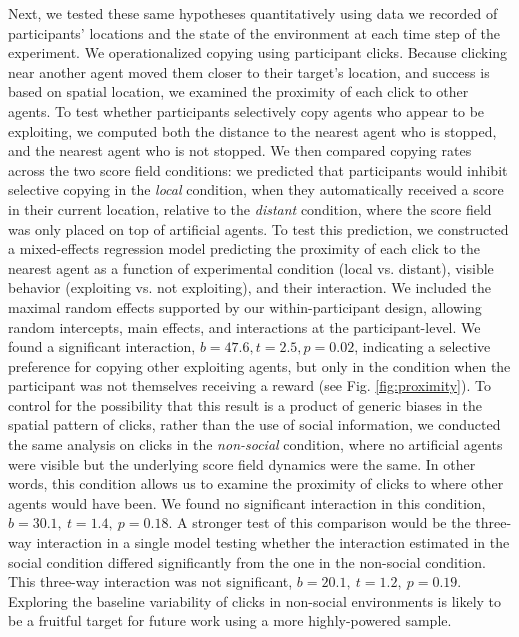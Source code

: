 \documentclass[12pt,letterpaper]{article}
\begin{document}
Next, we tested these same hypotheses quantitatively using data we recorded of participants' locations and the state of the environment at each time step of the experiment.
We operationalized copying using participant clicks.
Because clicking near another agent moved them closer to their target's location, and success is based on spatial location, we examined the proximity of each click to other agents.
To test whether participants selectively copy agents who appear to be exploiting, we computed both the distance to the nearest agent who is stopped, and the nearest agent who is not stopped.
We then compared copying rates across the two score field conditions: we predicted that participants would inhibit selective copying in the \emph{local} condition, when they automatically received a score in their current location, relative to the \emph{distant} condition, where the score field was only placed on top of artificial agents.
To test this prediction, we constructed a mixed-effects regression model predicting the proximity of each click to the nearest agent as a function of experimental condition (local vs. distant), visible behavior (exploiting vs. not exploiting), and their interaction.
We included the maximal random effects supported by our within-participant design, allowing random intercepts, main effects, and interactions at the participant-level.
We found a significant interaction, $b = 47.6, t = 2.5, p = 0.02$, indicating a selective preference for copying other exploiting agents, but only in the condition when the participant was not themselves receiving a reward (see Fig. \ref{fig:proximity}). 
To control for the possibility that this result is a product of generic biases in the spatial pattern of clicks, rather than the use of social information, we conducted the same analysis on clicks in the \emph{non-social} condition, where no artificial agents were visible but the underlying score field dynamics were the same. 
In other words, this condition allows us to examine the proximity of clicks to where other agents would have been. 
We found no significant interaction in this condition, $b=30.1,~t=1.4,~p=0.18$.
A stronger test of this comparison would be the three-way interaction in a single model testing whether the interaction estimated in the social condition differed significantly from the one in the non-social condition.
This three-way interaction was not significant, $b=20.1,~t=1.2,~p=0.19$. 
Exploring the baseline variability of clicks in non-social environments is likely to be a fruitful target for future work using a more highly-powered sample. 
\end{document}
